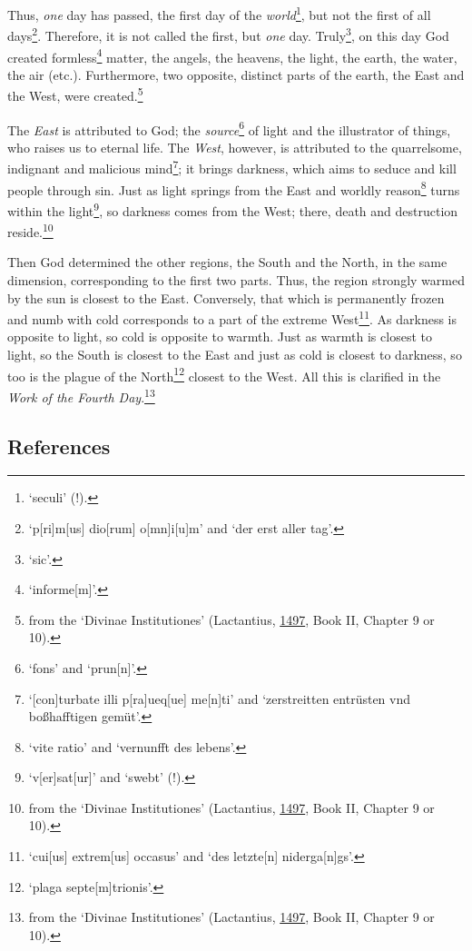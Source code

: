 \documentclass[
]{article}
\begin{document}
Thus, \emph{one} day has passed, the first day of the
\emph{world}\footnote{`seculi' (!).}, but not the first of all
days\footnote{`p{[}ri{]}m{[}us{]} dio{[}rum{]} o{[}mn{]}i{[}u{]}m' and
  `der erst aller tag'.}. Therefore, it is not called the first, but
\emph{one} day. Truly\footnote{`sic'.}, on this day God created
formless\footnote{`informe{[}m{]}'.} matter, the angels, the heavens,
the light, the earth, the water, the air (etc.). Furthermore, two
opposite, distinct parts of the earth, the East and the West, were
created.\footnote{from the `Divinae Institutiones' (Lactantius,
  \href{https://books.google.com/books?id=qGsnghsi3uUC}{1497}, Book II,
  Chapter 9 or 10).}

The \emph{East} is attributed to God; the \emph{source}\footnote{`fons'
  and `prun{[}n{]}'.} of light and the illustrator of things, who raises
us to eternal life. The \emph{West}, however, is attributed to the
quarrelsome, indignant and malicious mind\footnote{`{[}con{]}turbate
  illi p{[}ra{]}ueq{[}ue{]} me{[}n{]}ti' and `zerstreitten entrüsten vnd
  boßhafftigen gemüt'.}; it brings darkness, which aims to seduce and
kill people through sin. Just as light springs from the East and worldly
reason\footnote{`vite ratio' and `vernunfft des lebens'.} turns within
the light\footnote{`v{[}er{]}sat{[}ur{]}' and `swebt' (!).}, so darkness
comes from the West; there, death and destruction reside.\footnote{from
  the `Divinae Institutiones' (Lactantius,
  \href{https://books.google.com/books?id=qGsnghsi3uUC}{1497}, Book II,
  Chapter 9 or 10).}

Then God determined the other regions, the South and the North, in the
same dimension, corresponding to the first two parts. Thus, the region
strongly warmed by the sun is closest to the East. Conversely, that
which is permanently frozen and numb with cold corresponds to a part of
the extreme West\footnote{`cui{[}us{]} extrem{[}us{]} occasus' and `des
  letzte{[}n{]} niderga{[}n{]}gs'.}. As darkness is opposite to light,
so cold is opposite to warmth. Just as warmth is closest to light, so
the South is closest to the East and just as cold is closest to
darkness, so too is the plague of the North\footnote{`plaga
  septe{[}m{]}trionis'.} closest to the West. All this is clarified in
the \emph{Work of the Fourth Day}.\footnote{from the `Divinae
  Institutiones' (Lactantius,
  \href{https://books.google.com/books?id=qGsnghsi3uUC}{1497}, Book II,
  Chapter 9 or 10).}

\hypertarget{references}{%
\subsection{References}\label{references}}
\end{document}
